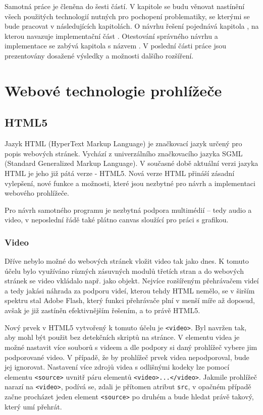 Samotná práce je členěna do šesti částí. V kapitole  se budu věnovat nastínění všech použitých technologií nutných pro pochopení problematiky, se kterými se bude pracovat v následujících kapitolách. O návrhu řešení pojednává kapitola , na kterou navazuje implementační část . Otestování správného návrhu a implementace se zabývá kapitola s názvem . V poslední části práce  jsou prezentovány dosažené výsledky a možnosti dalšího rozšíření.



\chapter{Webové technologie prohlížeče}
\label{chapter:2}

\section{HTML5}

Jazyk HTML (HyperText Markup Language) je značkovací jazyk určený pro popis webových stránek. Vychází z univerzálního značkovacího jazyka SGML (Standard Generalized Markup Language). V současné době aktuální verzi  jazyka HTML je jeho již pátá verze -  HTML5. Nová verze HTML přináší zásadní vylepšení, nové funkce a možnosti, které jsou nezbytné pro návrh a implementaci webového prohlížeče. 

Pro návrh samotného programu je nezbytná podpora multimédií – tedy audio a video, v neposlední řádě také plátno canvas sloužící pro práci s grafikou.



\subsection{Video}
Dříve nebylo možné do webových stránek vložit video tak jako dnes. K tomuto účelu bylo využíváno různých zásuvných modulů třetích stran a do webových stránek se video vkládalo např. jako objekt. Nejvíce rozšířeným přehrávačem videí a tedy jakási náhrada za podporu videí, kterou tehdy HTML nemělo, se v širším spektru stal Adobe Flash, který funkci přehrávače plní v menší míře až doposud, avšak je již zastíněn efektivnějším řešením, a to právě HTML5.

Nový prvek v HTML5 vytvořený k tomuto účelu je \texttt{<video>}. Byl navržen tak, aby mohl být použit bez detekčních skriptů na stránce. V elementu videa je možné nastavit více souborů s videem a dle podpory si daný prohlížeč vybere jim podporované video. V případě, že by prohlížeč prvek videa nepodporoval, bude jej ignorovat. Nastavení více zdrojů videa s odlišnými kodeky lze pomocí elementu \texttt{<source>} uvnitř páru elementů \texttt{<video>...</video>}. Jakmile prohlížeč narazí na \texttt{<video>}, podívá se, zdali je přítomen atribut \texttt{src}, v opačném případě začne procházet jeden element \texttt{<source>} po druhém a bude hledat právě takový, který umí přehrát.

